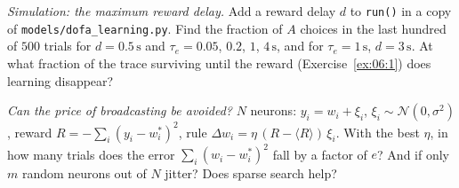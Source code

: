 \begin{exercise}[\lvlB]
\label{ex:06:7}
\emph{Simulation: the maximum reward delay.} Add a reward delay $d$ to \texttt{run()} in a copy of \texttt{models/\allowbreak dofa\_learning.py}. Find the fraction of $A$ choices in the last hundred of $500$ trials for $d=0.5\,\text{s}$ and $\tau_e=0.05$, $0.2$, $1$, $4\,\text{s}$, and for $\tau_e=1\,\text{s}$, $d=3\,\text{s}$. At what fraction of the trace surviving until the reward (Exercise~\ref{ex:06:1}) does learning disappear?
\end{exercise}

\begin{exercise}[\lvlC]
\label{ex:06:8}
\emph{Can the price of broadcasting be avoided?} $N$ neurons: $y_i=w_i+\xi_i$, $\xi_i\sim\mathcal N(0,\sigma^2)$, reward $R=-\sum_i(y_i-w_i^*)^2$, rule $\Delta w_i=\eta\,(R-\langle R\rangle)\,\xi_i$. With the best $\eta$, in how many trials does the error $\sum_i(w_i-w_i^*)^2$ fall by a factor of $e$? And if only $m$ random neurons out of $N$ jitter? Does sparse search help?
\end{exercise}
